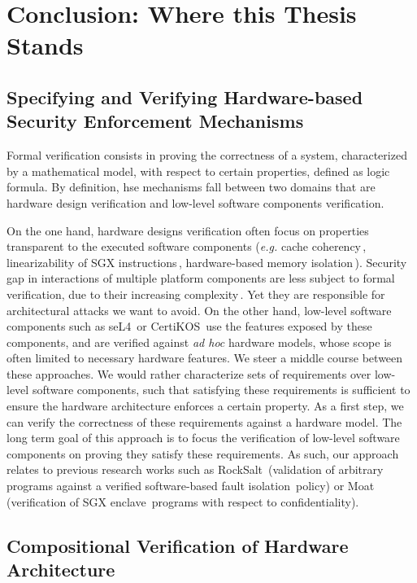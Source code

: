 \section{Conclusion: Where this Thesis Stands}

\subsection{Specifying and Verifying Hardware-based Security Enforcement
  Mechanisms}

Formal verification consists in proving the correctness of a system,
characterized by a mathematical model, with respect to certain properties,
defined as logic formula.
%
By definition, \ac{hse} mechanisms fall between two domains that are hardware
design verification and low-level software components verification.

On the one hand, hardware designs verification often focus on properties
transparent to the executed software components (\emph{e.g.} cache
coherency\,\cite{stern1995cachecoherence}, linearizability of SGX
instructions\,\cite{leslie2015sgx}, hardware-based memory
isolation\,\cite{lie2003xom}).
%
Security gap in interactions of multiple platform components are less subject to
formal verification, due to their increasing
complexity\,\cite{potlapally2011hardwaresecurity}.
%
Yet they are responsible for architectural attacks we want to avoid.
%
On the other hand, low-level software components such as
seL4\,\cite{klein2009sel4} or CertiKOS\,\cite{gu2016certikos} use the features
exposed by these components, and are verified against \emph{ad hoc} hardware
models, whose scope is often limited to necessary hardware features.
%
We steer a middle course between these approaches.
%
We would rather characterize sets of requirements over low-level software
components, such that satisfying these requirements is sufficient to ensure the
hardware architecture enforces a certain property.
%
As a first step, we can verify the correctness of these requirements against a
hardware model.
%
The long term goal of this approach is to focus the verification of low-level
software components on proving they satisfy these requirements.
%
As such, our approach relates to previous research works such as
RockSalt\,\cite{morrisett2012rocksalt} (validation of arbitrary programs against
a verified software-based fault isolation\,\cite{wahbe1994sfi} policy) or
Moat\,\cite{sinha2015moat} (verification of SGX
enclave\,\cite{costan2016sgxexplained} programs with respect to
confidentiality).

\subsection{Compositional Verification of Hardware Architecture}
